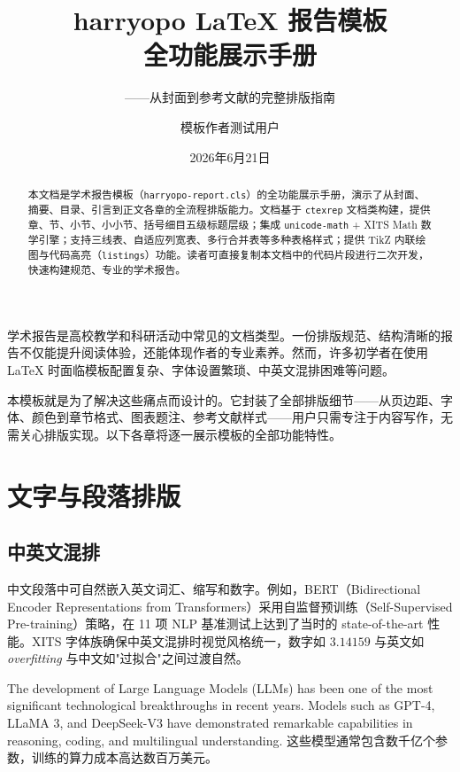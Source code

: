 \documentclass{harryopo-report}
\title{harryopo LaTeX 报告模板\\全功能展示手册}
\subtitle{——从封面到参考文献的完整排版指南}
\author{模板作者\quad 测试用户}
\date{2026年6月21日}
\begin{document}
\maketitle

\begin{abstract}
本文档是学术报告模板（\texttt{harryopo-report.cls}）的全功能展示手册，演示了从封面、摘要、目录、引言到正文各章的全流程排版能力。文档基于 \texttt{ctexrep} 文档类构建，提供章、节、小节、小小节、括号细目五级标题层级；集成 \texttt{unicode-math} + XITS Math 数学引擎；支持三线表、自适应列宽表、多行合并表等多种表格样式；提供 TikZ 内联绘图与代码高亮（\texttt{listings}）功能。读者可直接复制本文档中的代码片段进行二次开发，快速构建规范、专业的学术报告。
\end{abstract}

\tableofcontents

\introduction

学术报告是高校教学和科研活动中常见的文档类型。一份排版规范、结构清晰的报告不仅能提升阅读体验，还能体现作者的专业素养。然而，许多初学者在使用 LaTeX 时面临模板配置复杂、字体设置繁琐、中英文混排困难等问题。

本模板就是为了解决这些痛点而设计的。它封装了全部排版细节——从页边距、字体、颜色到章节格式、图表题注、参考文献样式——用户只需专注于内容写作，无需关心排版实现。以下各章将逐一展示模板的全部功能特性。

\chapter{文字与段落排版}

\section{中英文混排}

中文段落中可自然嵌入英文词汇、缩写和数字。例如，BERT（Bidirectional Encoder Representations from Transformers）采用自监督预训练（Self-Supervised Pre-training）策略，在 11 项 NLP 基准测试上达到了当时的 state-of-the-art 性能。XITS 字体族确保中英文混排时视觉风格统一，数字如 $3.14159$ 与英文如 \emph{overfitting} 与中文如"过拟合"之间过渡自然。

The development of Large Language Models (LLMs) has been one of the most significant technological breakthroughs in recent years. Models such as GPT-4, LLaMA 3, and DeepSeek-V3 have demonstrated remarkable capabilities in reasoning, coding, and multilingual understanding. 这些模型通常包含数千亿个参数，训练的算力成本高达数百万美元。
\end{document}

